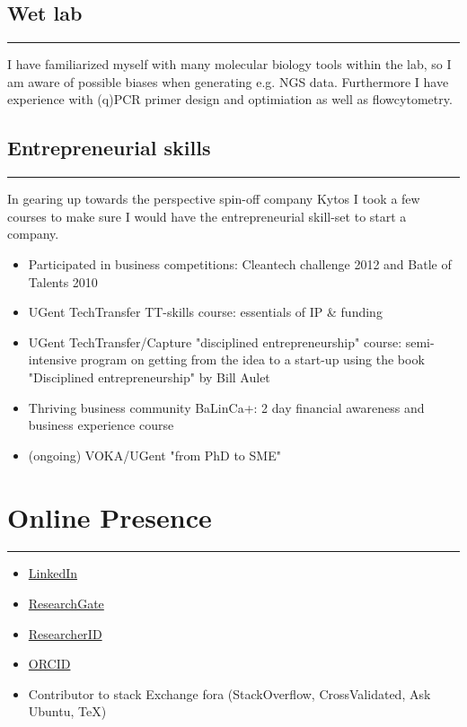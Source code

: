 \documentclass[a4paper,11pt,oneside]{article}
\begin{document}
\subsection*{Wet lab}
\rule{\textwidth}{1pt}
I have familiarized myself with many molecular biology tools within the lab, so 
I am aware of possible biases when generating e.g. NGS data. Furthermore I have experience with (q)PCR primer design 
and optimiation as well as flowcytometry.

\subsection*{Entrepreneurial skills}
\rule{\textwidth}{1pt}
In gearing up towards the perspective spin-off company Kytos I took a few courses
to make sure I would have the entrepreneurial skill-set to start a company.
\begin{itemize}
  \item Participated in business competitions: Cleantech challenge 2012 and Batle of Talents 2010
  \item UGent TechTransfer TT-skills course: essentials of IP \& funding
  \item UGent TechTransfer/Capture "disciplined entrepreneurship" course: semi-intensive program on getting from the idea to a start-up using the book "Disciplined entrepreneurship" by Bill Aulet
  \item Thriving business community BaLinCa+: 2 day financial awareness and business experience course 
  \item (ongoing) VOKA/UGent "from PhD to SME"
\end{itemize}


\section*{Online Presence}
\rule{\textwidth}{1pt}
\begin{itemize}
  \item \href{https://www.linkedin.com/pub/frederiek-maarten-kerckhof/26/b47/668}{LinkedIn}
  \item \href{https://www.researchgate.net/profile/Frederiek-Maarten_Kerckhof}{ResearchGate}
  \item \href{http://www.researcherid.com/ProfileView.action?SID=V2bGbhtEe1TlsfIEXBz&returnCode=ROUTER.Success&queryString=KG0UuZjN5WlUD2sX8KoC12Tw17vPT2A6ocQ5tgzRDDI\%253D\&SrcApp=CR\&Init=Yes}{ResearcherID}
  \item \href{http://orcid.org/0000-0002-4472-6810}{ORCID}
  \item Contributor to stack Exchange fora (StackOverflow, CrossValidated, Ask Ubuntu, TeX)
\end{itemize}

\newpage
\renewcommand{\refname}{Academic publications and conference proceedings} %
\renewcommand{\bibname}{Academic publications and conference proceedings} %
\nocite{*}


%
\end{document}
